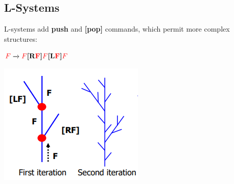 \documentclass[11pt]{article}
\begin{document}
  \subsection{L-Systems}
  L-systems add \textbf{push} and \textbf{[pop]} commands, which
  permit more complex structures:\\

  \begin{minipage}[c]{0.5\textwidth}
    \begin{center}
      $\textcolor{red}{F} \xrightarrow{} \textcolor{red}{F}\textbf{[R\textcolor{red}{F}]}\textcolor{red}{F}\textbf{[L\textcolor{red}{F}]}\textcolor{red}{F}$
    \end{center}
  \end{minipage}
  \hfill
  \begin{minipage}[c]{0.5\textwidth}
    \includegraphics[scale=0.7]{lsystem}

  \end{minipage}
\end{document}
